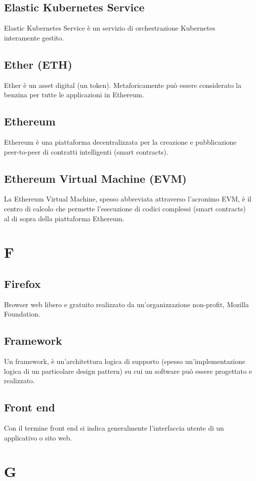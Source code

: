 \subsection{Elastic Kubernetes Service}  Elastic Kubernetes Service è un servizio di orchestrazione Kubernetes interamente gestito.
\subsection{Ether (ETH)}  Ether è un asset digital (un token). Metaforicamente può essere considerato la benzina per tutte le applicazioni in Ethereum.
\subsection{Ethereum}  Ethereum è una piattaforma decentralizzata per la creazione e pubblicazione peer-to-peer di contratti intelligenti (smart contracts).
\subsection{Ethereum Virtual Machine (EVM)}  La Ethereum Virtual Machine, spesso abbreviata attraverso l’acronimo EVM, è il centro di calcolo che permette l’esecuzione di codici complessi (smart contracts) al di sopra della piattaforma Ethereum.


\newpage \section{F}
\subsection{Firefox}  Browser web libero e gratuito realizzato da un'organizzazione non-profit, Mozilla Foundation.
\subsection{Framework}  Un framework, è un'architettura logica di supporto (spesso un'implementazione logica di un particolare design pattern) su cui un software può essere progettato e realizzato.
\subsection{Front end}  Con il termine front end si indica generalmente l'interfaccia utente di un applicativo o sito web.

\newpage \section{G}
